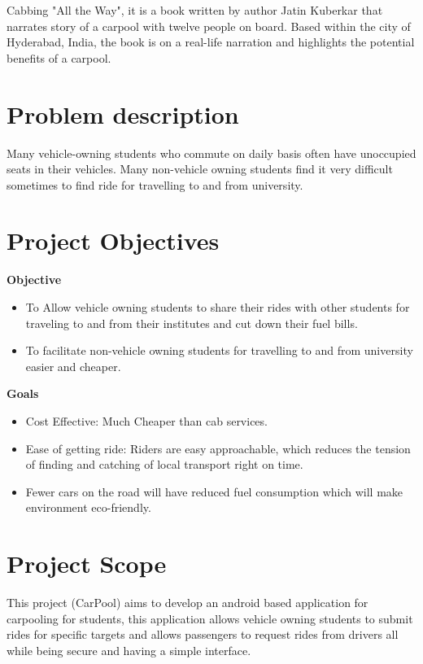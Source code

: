Cabbing "All the Way", it is a book written by author Jatin Kuberkar that narrates story of a carpool with twelve people on board. Based within the city of Hyderabad, India, the book is on a real-life narration and highlights the potential benefits of a carpool.

\section{Problem description}
Many vehicle-owning students who commute on daily basis often have unoccupied seats in their vehicles. Many non-vehicle owning students find it very difficult sometimes to find ride for travelling to and from university.

\section{Project Objectives}
\textbf{Objective}
\begin{itemize}

\item To Allow vehicle owning students to share their rides with other students for traveling to and from their institutes and cut down their fuel bills.

\item To facilitate non-vehicle owning students for travelling to and from university easier and cheaper.

\end{itemize}
\textbf{Goals}
\begin{itemize}

\item Cost Effective: Much Cheaper than cab services.
\item Ease of getting ride: Riders are easy approachable, which reduces the tension of finding and catching of local transport right on time.
\item Fewer cars on the road will have reduced fuel consumption which will make environment eco-friendly.
\end{itemize}

\section{Project Scope}
This project (CarPool) aims to develop an android based application for carpooling for students, this application allows vehicle owning students to submit rides for specific targets and allows passengers to request rides from drivers all while being secure and having a simple interface.\\

